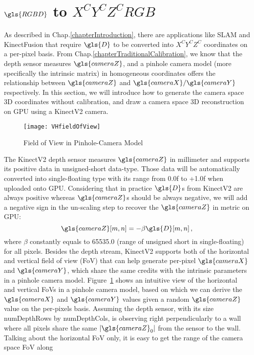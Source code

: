 \section{\(\gls{RGBD}\) to \(X^CY^CZ^CRGB\)}
\label{sectionCameraSpaceReconstruction}
As described in Chap.\ref{chapterIntroduction}, there are applications like \gls{SLAM} and KinectFusion that require \(\gls{D}\) to be converted into \(X^CY^CZ^C\) coordinates on a per-pixel basis. From Chap.\ref{chapterTraditionalCalibration}, we know that the depth sensor measures \(\gls{cameraZ}\), and a pinhole camera model (more specifically the intrinsic matrix) in homogeneous coordinates offers the relationship between \(\gls{cameraZ}\) and \(\gls{cameraX}/\gls{cameraY}\) respectively. In this section, we will introduce how to generate the camera space \gls{3D} coordinates without calibration, and draw a camera space \gls{3D} reconstruction on \gls{GPU} using a \gls{KinectV2} camera.
\\\indent
%
\begin{figure}[!b]
\centering
\texttt{[image: VHfieldOfView]}
\caption{Field of View in Pinhole-Camera Model}
\label{VHfieldOfView}
\end{figure}%
%
The \gls{KinectV2} depth sensor measures \(\gls{cameraZ}\) in millimeter and supports its positive data in unsigned-short data-type. Those data will be automatically converted into single-floating type with its range from 0.0f to +1.0f when uploaded onto \gls{GPU}. Considering that in practice \(\gls{D}\)s from \gls{KinectV2} are always positive whereas \(\gls{cameraZ}\)s should be always negative, we will add a negative sign in the un-scaling step to recover the \(\gls{cameraZ}\) in metric on \gls{GPU}:
\begin{equation}
\gls{cameraZ}[m, n] = - \beta \gls{D}[m, n] \, ,
\label{unscalingZc}
\end{equation}%
\noindent
where \(\beta\) constantly equals to 65535.0 (range of unsigned short in single-floating) for all pixels. Besides the depth stream, \gls{KinectV2} supports both of the horizontal and vertical field of view (\gls{FoV}) that can help generate per-pixel \(\gls{cameraX}\) and \(\gls{cameraY}\), which share the same credits with the intrinsic parameters in a pinhole camera model. Figure~\ref{VHfieldOfView} shows an intuitive view of the horizontal and vertical FoVs in a pinhole camera model, based on which we can derive the \(\gls{cameraX}\) and \(\gls{cameraY}\) values given a random \(\gls{cameraZ}\) value on the per-pixels basis. Assuming the depth sensor, with its size numDepthRows by numDepthCols, is observing right perpendicularly to a wall where all pixels share the same \(|\gls{cameraZ}_0|\) from the sensor to the wall. Talking about the horizontal \gls{FoV} only, it is easy to get the range of the camera space \gls{FoV} along 
